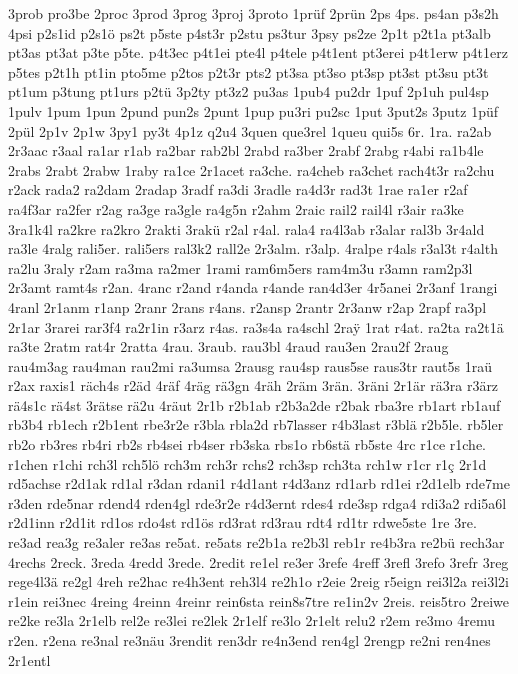 {3prob
pro3be
2proc
3prod
3prog
3proj
3proto
1prüf
2prün
2ps
4ps.
ps4an
p3s2h
4psi
p2s1id
p2s1ö
ps2t
p5ste
p4st3r
p2stu
ps3tur
3psy
ps2ze
2p1t
p2t1a
pt3alb
pt3as
pt3at
p3te
p5te.
p4t3ec
p4t1ei
pte4l
p4tele
p4t1ent
pt3erei
p4t1erw
p4t1erz
p5tes
p2t1h
pt1in
pto5me
p2tos
p2t3r
pts2
pt3sa
pt3so
pt3sp
pt3st
pt3su
pt3t
pt1um
p3tung
pt1urs
p2tü
3p2ty
pt3z2
pu3as
1pub4
pu2dr
1puf
2p1uh
pul4sp
1pulv
1pum
1pun
2pund
pun2s
2punt
1pup
pu3ri
pu2sc
1put
3put2s
3putz
1püf
2pül
2p1v
2p1w
3py1
py3t
4p1z
q2u4
3quen
que3rel
1queu
qui5s
6r.
1ra.
ra2ab
2r3aac
r3aal
ra1ar
r1ab
ra2bar
rab2bl
2rabd
ra3ber
2rabf
2rabg
r4abi
ra1b4le
2rabs
2rabt
2rabw
1raby
ra1ce
2r1acet
ra3che.
ra4cheb
ra3chet
rach4t3r
ra2chu
r2ack
rada2
ra2dam
2radap
3radf
ra3di
3radle
ra4d3r
rad3t
1rae
ra1er
r2af
ra4f3ar
ra2fer
r2ag
ra3ge
ra3gle
ra4g5n
r2ahm
2raic
rail2
rail4l
r3air
ra3ke
3ra1k4l
ra2kre
ra2kro
2rakti
3rakü
r2al
r4al.
rala4
ra4l3ab
r3alar
ral3b
3r4ald
ra3le
4ralg
rali5er.
rali5ers
ral3k2
rall2e
2r3alm.
r3alp.
4ralpe
r4als
r3al3t
r4alth
ra2lu
3raly
r2am
ra3ma
ra2mer
1rami
ram6m5ers
ram4m3u
r3amn
ram2p3l
2r3amt
ramt4s
r2an.
4ranc
r2and
r4anda
r4ande
ran4d3er
4r5anei
2r3anf
1rangi
4ranl
2r1anm
r1anp
2ranr
2rans
r4ans.
r2ansp
2rantr
2r3anw
r2ap
2rapf
ra3pl
2r1ar
3rarei
rar3f4
ra2r1in
r3arz
r4as.
ra3s4a
ra4schl
2ra^^ff
1rat
r4at.
ra2ta
ra2t1ä
ra3te
2ratm
rat4r
2ratta
4rau.
3raub.
rau3bl
4raud
rau3en
2rau2f
2raug
rau4m3ag
rau4man
rau2mi
ra3umsa
2rausg
rau4sp
raus5se
raus3tr
raut5s
1raü
r2ax
raxis1
räch4s
r2äd
4räf
4räg
rä3gn
4räh
2räm
3rän.
3räni
2r1är
rä3ra
r3ärz
rä4s1c
rä4st
3rätse
rä2u
4räut
2r1b
r2b1ab
r2b3a2de
r2bak
rba3re
rb1art
rb1auf
rb3b4
rb1ech
r2b1ent
rbe3r2e
r3bla
rbla2d
rb7lasser
r4b3last
r3blä
r2b5le.
rb5ler
rb2o
rb3res
rb4ri
rb2s
rb4sei
rb4ser
rb3ska
rbs1o
rb6stä
rb5ste
4rc
r1ce
r1che.
r1chen
r1chi
rch3l
rch5lö
rch3m
rch3r
rchs2
rch3sp
rch3ta
rch1w
r1cr
r1ç
2r1d
rd5achse
r2d1ak
rd1al
r3dan
rdani1
r4d1ant
r4d3anz
rd1arb
rd1ei
r2d1elb
rde7me
r3den
rde5nar
rdend4
rden4gl
rde3r2e
r4d3ernt
rdes4
rde3sp
rdga4
rdi3a2
rdi5a6l
r2d1inn
r2d1it
rd1os
rdo4st
rd1ös
rd3rat
rd3rau
rdt4
rd1tr
rdwe5ste
1re
3re.
re3ad
rea3g
re3aler
re3as
re5at.
re5ats
re2b1a
re2b3l
reb1r
re4b3ra
re2bü
rech3ar
4rechs
2reck.
3reda
4redd
3rede.
2redit
re1el
re3er
3refe
4reff
3refl
3refo
3refr
3reg
rege4l3ä
re2gl
4reh
re2hac
re4h3ent
reh3l4
re2h1o
r2eie
2reig
r5eign
rei3l2a
rei3l2i
r1ein
rei3nec
4reing
4reinn
4reinr
rein6sta
rein8s7tre
re1in2v
2reis.
reis5tro
2reiwe
re2ke
re3la
2r1elb
rel2e
re3lei
re2lek
2r1elf
re3lo
2r1elt
relu2
r2em
re3mo
4remu
r2en.
r2ena
re3nal
re3näu
3rendit
ren3dr
re4n3end
ren4gl
2rengp
re2ni
ren4nes
2r1entl
}
